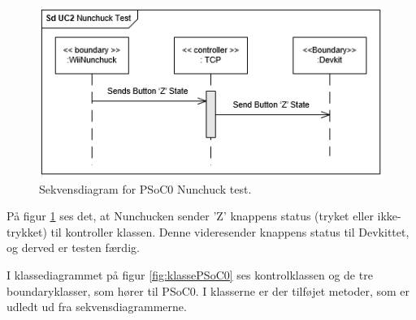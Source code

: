 \begin{figure}[H]
	\centering
	\includegraphics[width=\textwidth] {Systemarkitektur/images/SDPSoC0NunchuckTest}
	\caption{Sekvensdiagram for PSoC0 Nunchuck test.}
	\label{fig:sekvensPSoC0NunchuckTest}
\end{figure}

På figur \ref{fig:sekvensPSoC0NunchuckTest} ses det, at Nunchucken sender 'Z' knappens status (tryket eller ikke-trykket) til kontroller klassen. Denne videresender knappens status til Devkittet, og derved er testen færdig.\newline

I klassediagrammet på figur \ref{fig:klassePSoC0} ses kontrolklassen og de tre boundaryklasser, som hører til PSoC0. I klasserne er der tilføjet metoder, som er udledt ud fra sekvensdiagrammerne. 

